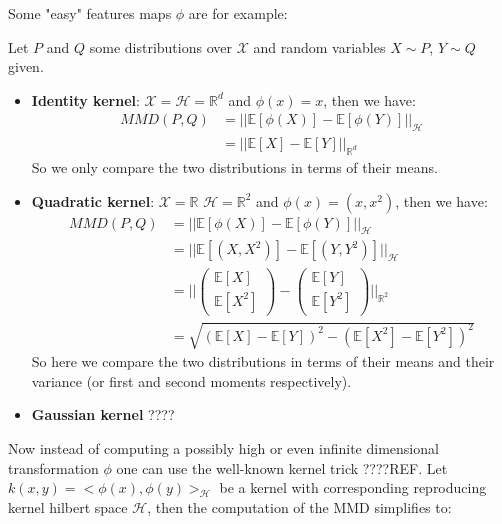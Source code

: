Some "easy" features maps $\phi$ are for example:
\begin{ex}
    Let $P$ and $Q$ some distributions over $\mathcal{X}$ and random variables $X \sim P$, $Y \sim Q$ given.
    \begin{itemize}
        \item \textbf{Identity kernel}: $\mathcal{X}=\mathcal{H}=\mathbb{R}^d$ and $\phi(x)=x$, then we have:
        \begin{align}
            MMD(P,Q) &= || \mathbb{E}[\phi(X)] - \mathbb{E}[\phi(Y)] ||_\mathcal{H} \nonumber \\
            &= || \mathbb{E}[X] - \mathbb{E}[Y] ||_{\mathbb{R}^d}
        \end{align}
        So we only compare the two distributions in terms of their means. 

        \item \textbf{Quadratic kernel}: $\mathcal{X}=\mathbb{R}$ $\mathcal{H}=\mathbb{R}^2$ and $\phi(x)=(x, x^2)$, then we have:
        \begin{align}
            MMD(P,Q) &= || \mathbb{E}[\phi(X)] - \mathbb{E}[\phi(Y)] ||_\mathcal{H} \nonumber \\
            &= || \mathbb{E}[(X, X^2)] - \mathbb{E}[(Y, Y^2)] ||_\mathcal{H} \nonumber \\
            &= || \begin{pmatrix}
                \mathbb{E}[X] \\ \mathbb{E}[X^2]
            \end{pmatrix} - \begin{pmatrix}
                \mathbb{E}[Y] \\ \mathbb{E}[Y^2]
            \end{pmatrix} ||_{\mathbb{R}^2} \nonumber \\
            &= \sqrt{(\mathbb{E}[X] - \mathbb{E}[Y])^2 - (\mathbb{E}[X^2] - \mathbb{E}[Y^2])^2}
        \end{align}
        So here we compare the two distributions in terms of their means and their variance (or first and second moments respectively).
        \item \textbf{Gaussian kernel} ????
    \end{itemize}
\end{ex}

Now instead of computing a possibly high or even infinite dimensional transformation $\phi$ one can use the well-known kernel trick ????REF. Let $k(x,y)=<\phi(x), \phi(y)>_{\mathcal{H}}$ be a kernel with corresponding reproducing kernel hilbert space $\mathcal{H}$, then the computation of the MMD simplifies to:


